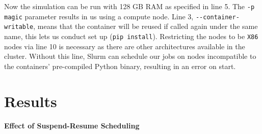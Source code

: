Now the simulation can be run with 128 GB RAM as specified in line 5. 
The \verb|-p magic| parameter results in us using a compute node. 
Line 3, \verb|--container-writable|, means that the container will be reused if called again under the same name, this lets us conduct set up  (\verb|pip install|).
Restricting the nodes to be \verb|X86| nodes via line 10 is necessary as there are other architectures available in the cluster. 
Without this line, Slurm can schedule our jobs on nodes incompatible to the containers' pre-compiled Python binary, resulting in an error on start.

\section{Results}

\paragraph{Effect of Suspend-Resume Scheduling}


